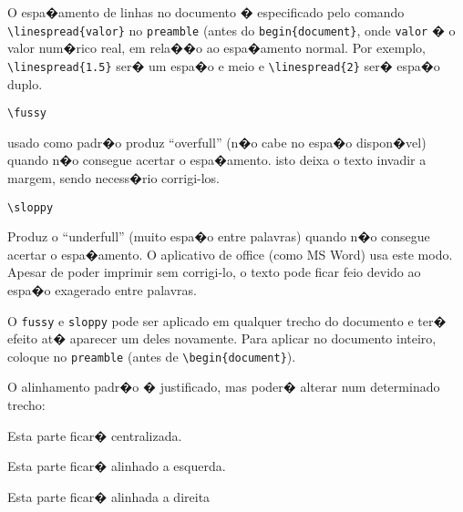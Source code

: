 \documentclass[12pt,a4paper]{article}
\begin{document}

O espa�amento de linhas no documento � especificado pelo comando
\verb|\linespread{valor}| no \texttt{preamble} (antes do \verb|begin{document}|,
onde \texttt{valor} � o valor num�rico real, em rela��o ao espa�amento normal.
Por exemplo, \verb|\linespread{1.5}| ser� um espa�o e meio e 
 \verb|\linespread{2}| ser� espa�o duplo.
 

\verb|\fussy|

usado como padr�o produz ``overfull'' (n�o cabe no espa�o dispon�vel) quando 
n�o consegue acertar o espa�amento. isto deixa o texto invadir a margem, 
sendo necess�rio corrigi-los.

\verb|\sloppy|

Produz o ``underfull'' (muito espa�o entre palavras) quando n�o consegue acertar
o espa�amento. O aplicativo de office (como MS Word) usa este modo. 
Apesar de poder imprimir sem corrigi-lo, o texto pode ficar feio devido ao 
espa�o exagerado entre palavras.

O \verb|fussy| e \verb|sloppy| pode ser aplicado em qualquer trecho do documento
e ter� efeito at� aparecer um deles novamente. Para aplicar no documento
inteiro, coloque no \texttt{preamble} (antes de \verb|\begin{document}|).

O alinhamento padr�o � justificado, mas poder� alterar num determinado trecho:


\begin{center}
    Esta parte ficar� centralizada.
\end{center}


\begin{flushleft}
Esta parte ficar� alinhado a esquerda.
\end{flushleft}


\begin{flushright}
Esta parte ficar� alinhada a direita
\end{flushright}


 
\end{document}
